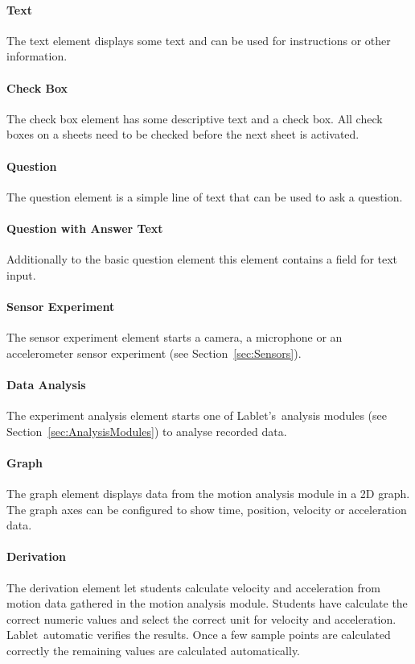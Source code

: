 \documentclass{sigchi}
\newcommand{\lablet}{Lablet\ }
\newcommand{\lablets}{Lablet's\ }
\begin{document}
\paragraph{Text}
The text element displays some text and can be used for instructions or other information.

\paragraph{Check Box}
The check box element has some descriptive text and a check box.
All check boxes on a sheets need to be checked before the next sheet is activated.

\paragraph{Question}
The question element is a simple line of text that can be used to ask a question.

\paragraph{Question with Answer Text}
Additionally to the basic question element this element contains a field for text input.

\paragraph{Sensor Experiment}
The sensor experiment element starts a camera, a microphone or an accelerometer sensor experiment (see Section~\ref{sec:Sensors}).

\paragraph{Data Analysis}
The experiment analysis element starts one of \lablets analysis modules (see Section~\ref{sec:AnalysisModules}) to analyse recorded data.

\paragraph{Graph}
The graph element displays data from the motion analysis module in a 2D graph.
The graph axes can be configured to show time, position, velocity or acceleration data.

\paragraph{Derivation}
The derivation element let students calculate velocity and acceleration from motion data gathered in the motion analysis module.
Students have calculate the correct numeric values and select the correct unit for velocity and acceleration.
\lablet automatic verifies the results.
Once a few sample points are calculated correctly the remaining values are calculated automatically.
\end{document}
